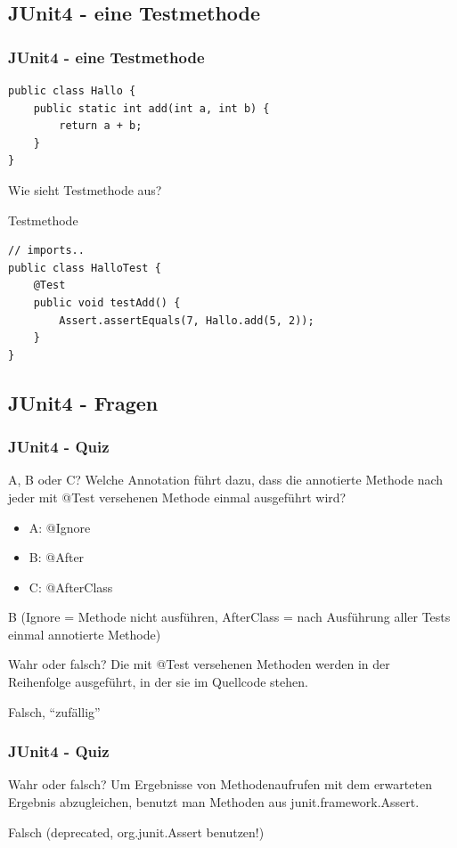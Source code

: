 \documentclass[18pt]{beamer}
\begin{document}
	\subsection{JUnit4 - eine Testmethode}
	\begin{frame}[fragile]
		\frametitle{JUnit4 - eine Testmethode}
			\begin{verbatim}
public class Hallo {
    public static int add(int a, int b) { 
        return a + b;
    }
}
			\end{verbatim}
		Wie sieht Testmethode aus? \pause
		\begin{block}{Testmethode}
			\begin{verbatim}
// imports..
public class HalloTest {
    @Test
    public void testAdd() {
        Assert.assertEquals(7, Hallo.add(5, 2));
    }
}
			\end{verbatim}
		\end{block}
\end{frame}
	
	\subsection{JUnit4 - Fragen}
	\begin{frame}[fragile]
		\frametitle{JUnit4 - Quiz}
		\begin{block}{A, B oder C?}
			Welche Annotation führt dazu, dass die annotierte Methode nach jeder mit @Test versehenen Methode einmal ausgeführt wird?
			\begin{itemize}
				\item A: @Ignore
				\item B: @After
				\item C: @AfterClass
			\end{itemize}
		\end{block}
		\pause
		B (Ignore = Methode nicht ausführen, AfterClass = nach Ausführung aller Tests einmal annotierte Methode)
		\pause
		\begin{block}{Wahr oder falsch?}
			Die mit @Test versehenen Methoden werden in der Reihenfolge ausgeführt, in der sie im Quellcode stehen.
		\end{block}
		\pause
		Falsch, \enquote{zufällig}
	\end{frame}

	\begin{frame}
	\frametitle{JUnit4 - Quiz}
	\begin{block}{Wahr oder falsch?}
		Um Ergebnisse von Methodenaufrufen mit dem erwarteten Ergebnis abzugleichen, benutzt man Methoden aus junit.framework.Assert.
	\end{block}
	\pause
	Falsch (deprecated, org.junit.Assert benutzen!)
	
	\end{frame}
		
\end{document}
